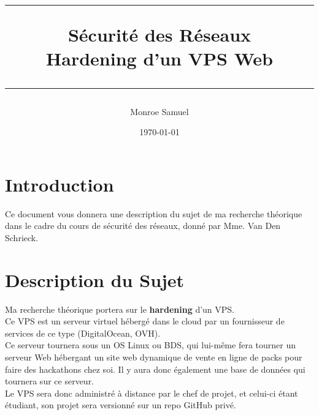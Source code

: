 \documentclass[a4paper,10pt,final,fleqn]{article}
\title{
\parbox{15cm}
{ %
  \vspace{3cm}
	\begin{center}\sf\bfseries\Huge
		\rule{15cm}{1pt}
		\medskip
		Sécurité des Réseaux \\
		\huge Hardening d'un VPS Web
		\vspace{.5cm}
		\rule{15cm}{1pt}
	\end{center}
	\vspace{3cm}
 }}
\author{Monroe Samuel}
\date{\today}
\begin{document}
\maketitle
\newpage

	\section{Introduction}

		Ce document vous donnera une description du sujet de ma recherche théorique dans le cadre du cours de sécurité des réseaux, donné par Mme. Van Den Schrieck.\\

	\section{Description du Sujet}

		Ma recherche théorique portera sur le \textbf{hardening} d'un VPS.\\

		Ce VPS est un serveur virtuel hébergé dans le cloud par un fournisseur de services de ce type (DigitalOcean, OVH).\\
		Ce serveur tournera sous un OS Linux ou BDS, qui lui-même fera tourner un serveur Web hébergant un site web dynamique de vente en ligne de packs pour faire des hackathons chez soi. Il y aura donc également une base de données qui tournera sur ce serveur.\\

		Le VPS sera donc administré à distance par le chef de projet, et celui-ci étant étudiant, son projet sera versionné sur un repo GitHub privé.\\
\end{document}
